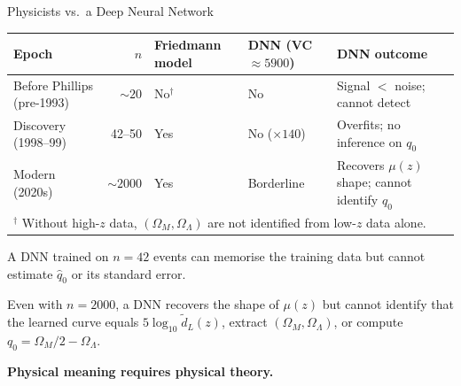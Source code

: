 \documentclass[aspectratio=169]{beamer}
\begin{document}
\begin{frame}{Physicists vs.\ a Deep Neural Network}

\begin{center}
\small
\begin{tabular}{p{2.8cm}rp{2.8cm}p{2.5cm}p{3.8cm}}
\toprule
Epoch & $n$ & Friedmann model & DNN (VC $\approx 5900$) & DNN outcome \\
\midrule
Before Phillips (pre-1993)
  & $\sim 20$ & No$^\dagger$
  & No & Signal $<$ noise; cannot detect \\
Discovery (1998--99)
  & 42--50 & Yes
  & No ($\times 140$) & Overfits; no inference on $q_0$ \\
Modern (2020s)
  & $\sim 2000$ & Yes
  & Borderline & Recovers $\mu(z)$ shape;
    cannot identify $q_0$ \\
\bottomrule
\multicolumn{5}{p{14cm}}{\small $^\dagger$ Without high-$z$ data,
  $(\Omega_M,\Omega_\Lambda)$ are not identified from low-$z$ data alone.}
\end{tabular}
\end{center}

\medskip
A DNN trained on $n = 42$ events can memorise the training data but
cannot estimate $\hat q_0$ or its standard error.

\medskip
Even with $n = 2000$, a DNN recovers the shape of $\mu(z)$ but cannot
identify that the learned curve equals $5\log_{10}\tilde d_L(z)$, extract
$(\Omega_M,\Omega_\Lambda)$, or compute $q_0 = \Omega_M/2 - \Omega_\Lambda$.

\medskip
\textbf{Physical meaning requires physical theory.}

\end{frame}
\end{document}
